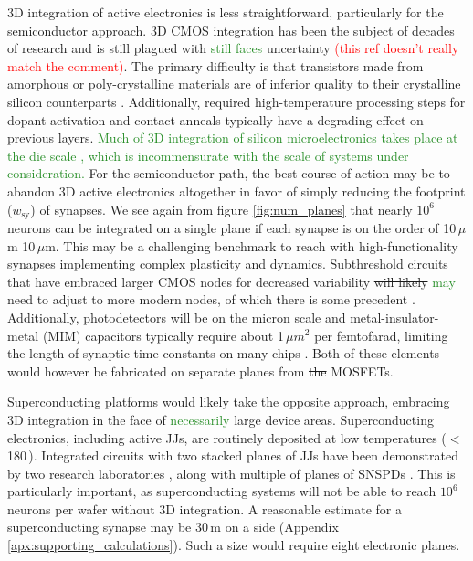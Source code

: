 \documentclass[twocolumn]{article}
\begin{document}
3D integration of active electronics is less straightforward, particularly for the semiconductor approach. 3D CMOS integration has been the subject of decades of research \cite{refs} and \sout{is still plagued with} \textcolor{ForestGreen}{still faces} uncertainty \sout{\cite{lish2017}} \textcolor{red}{(this ref doesn't really match the comment)}. The primary difficulty is that transistors made from amorphous or poly-crystalline materials are of inferior quality to their crystalline silicon counterparts \cite{}. Additionally, required high-temperature processing steps for dopant activation and contact anneals typically have a degrading effect on previous layers. \textcolor{ForestGreen}{Much of 3D integration of silicon microelectronics takes place at the die scale \cite{elfe2016}, which is incommensurate with the scale of systems under consideration.} For the semiconductor path, the best course of action may be to abandon 3D active electronics altogether in favor of simply reducing the footprint ($w_{\mathrm{sy}}$) of synapses. We see again from figure \ref{fig:num_planes} that nearly $10^6$ neurons can be integrated on a single plane if each synapse is on the order of 10\,$\mu$m\,\times\,10\,$\mu$m. This may be a challenging benchmark to reach with high-functionality synapses implementing complex plasticity and dynamics. Subthreshold circuits that have embraced larger CMOS nodes for decreased variability \sout{will likely} \textcolor{ForestGreen}{may} need to adjust to more modern nodes, of which there is some precedent \cite{rupa2019}. Additionally, photodetectors will be on the micron scale and metal-insulator-metal (MIM) capacitors typically require about 1\,$\mu m^2$ per femtofarad, limiting the length of synaptic time constants on many chips \cite{indiveri2019importance}. Both of these elements would however be fabricated on separate planes from \sout{the} MOSFETs.

Superconducting platforms would likely take the opposite approach, embracing 3D integration in the face of \textcolor{ForestGreen}{necessarily} large device areas. Superconducting electronics, including active JJs, are routinely deposited at low temperatures ($<$\,180\,\textcelsius). Integrated circuits with two stacked planes of JJs have been demonstrated by two research laboratories \cite{tobo2019,anna2017}, along with multiple of planes of SNSPDs \cite{vema2012}. This is particularly important, as superconducting systems will not be able to reach $10^6$ neurons per wafer without 3D integration. A reasonable estimate for a superconducting synapse may be 30\,\textmu m on a side (Appendix \ref{apx:supporting_calculations}). Such a size would require eight electronic planes. 
\end{document}
